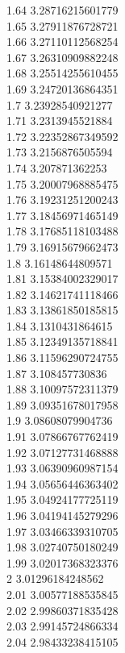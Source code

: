 {1.64	3.28716215601779\\
1.65	3.27911876728721\\
1.66	3.27110112568254\\
1.67	3.26310909882248\\
1.68	3.25514255610455\\
1.69	3.24720136864351\\
1.7	3.23928540921277\\
1.71	3.2313945521884\\
1.72	3.22352867349592\\
1.73	3.2156876505594\\
1.74	3.207871362253\\
1.75	3.20007968885475\\
1.76	3.19231251200243\\
1.77	3.18456971465149\\
1.78	3.17685118103488\\
1.79	3.16915679662473\\
1.8	3.16148644809571\\
1.81	3.15384002329017\\
1.82	3.14621741118466\\
1.83	3.13861850185815\\
1.84	3.1310431864615\\
1.85	3.12349135718841\\
1.86	3.11596290724755\\
1.87	3.108457730836\\
1.88	3.10097572311379\\
1.89	3.09351678017958\\
1.9	3.08608079904736\\
1.91	3.07866767762419\\
1.92	3.07127731468888\\
1.93	3.06390960987154\\
1.94	3.05656446363402\\
1.95	3.04924177725119\\
1.96	3.04194145279296\\
1.97	3.03466339310705\\
1.98	3.02740750180249\\
1.99	3.02017368323376\\
2	3.01296184248562\\
2.01	3.00577188535845\\
2.02	2.99860371835428\\
2.03	2.99145724866334\\
2.04	2.98433238415105\\
}
